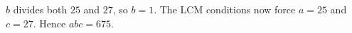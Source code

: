 $b$ divides both $25$ and $27$, so $b=1$. The LCM conditions now force $a=25$ and $c=27$. Hence $abc=\boxed{675}$.
